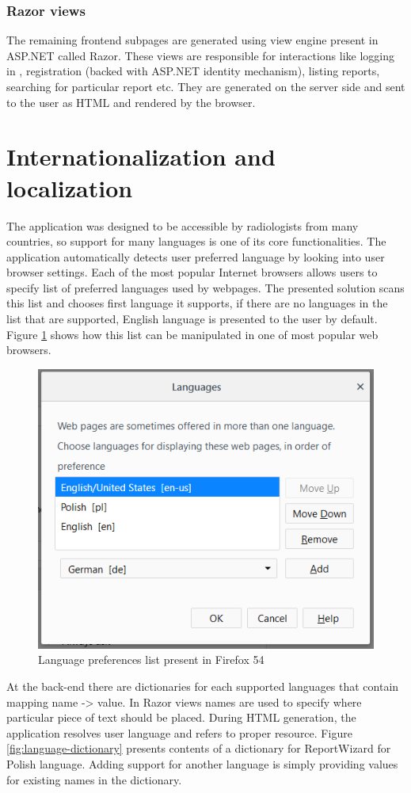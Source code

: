 \documentclass[12pt, twoside, openany]{report}
\theoremstyle{definition}
\begin{document}
\subsubsection{Razor views}
The remaining frontend subpages are generated using view engine present in ASP.NET called Razor. These views are responsible for interactions like logging in , registration (backed with ASP.NET identity mechanism), listing reports, searching for particular report etc. They are generated on the server side and sent to the user as HTML and rendered by the browser.
 


\section{Internationalization and localization}
The application was designed to be accessible by radiologists from many countries, so support for many languages is one of its core functionalities. The application automatically detects user preferred language by looking into user browser settings. Each of the most popular Internet browsers allows users to specify list of preferred languages used by webpages. The presented solution scans this list and chooses first language it supports, if there are no languages in the list that are supported, English language is presented to the user by default. Figure \ref{fig:language-preferences} shows how this list can be manipulated in one of most popular web browsers.
\begin{figure}
    \centering
    \includegraphics[width=0.6\linewidth]{language-preferences}
    \caption{Language preferences list present in Firefox 54\label{fig:language-preferences}}
\end{figure}

At the back-end there are dictionaries for each supported languages that contain mapping name -> value. 
In Razor views names are used to specify where particular piece of text should be placed. During HTML generation, the application resolves user language and refers to proper resource. Figure \ref{fig:language-dictionary} presents contents of a dictionary for ReportWizard for Polish language. Adding support for another language is simply providing values for existing names in the dictionary.
\end{document}
